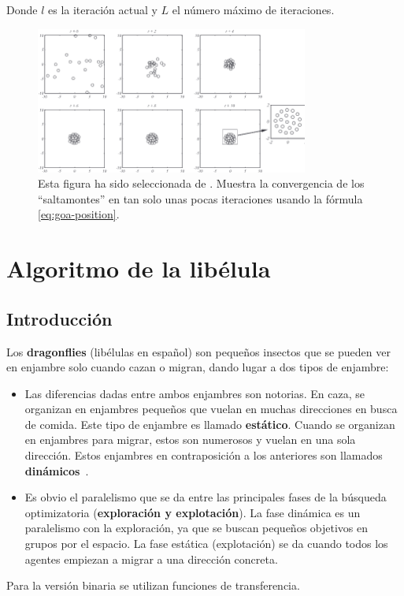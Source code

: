 Donde $l$ es la iteración actual y $L$ el número máximo de iteraciones.

\begin{figure}[htp]
    \begin{center}
        \includegraphics[width=0.8\textwidth]{imagenes/goa-position-convergence.png}
    \end{center}
    \caption[Convergencia en GOA]{Esta figura ha sido seleccionada de \cite{saremi_grasshopper_2017}. Muestra la convergencia de los ``saltamontes'' en tan solo unas pocas iteraciones usando la fórmula \ref{eq:goa-position}.}
\end{figure}

\section{Algoritmo de la libélula}
\subsection{Introducción}
Los \textbf{dragonflies} (libélulas en español) son pequeños insectos que se pueden ver en enjambre solo cuando cazan o migran, dando lugar a dos tipos de enjambre:
\begin{itemize}
    \item Las diferencias dadas entre ambos enjambres son notorias. En caza, se organizan en enjambres pequeños que vuelan en muchas direcciones en busca de comida. Este tipo de enjambre es llamado \textbf{estático}. Cuando se organizan en enjambres para migrar, estos son numerosos y vuelan en una sola dirección. Estos enjambres en contraposición a los anteriores son llamados \textbf{dinámicos}~\cite{mirjalili_dragonfly_2016}.
    \item Es obvio el paralelismo que se da entre las principales fases de la búsqueda optimizatoria (\textbf{exploración y explotación}). La fase dinámica es un paralelismo con la exploración, ya que se buscan pequeños objetivos en grupos por el espacio. La fase estática (explotación) se da cuando todos los agentes empiezan a migrar a una dirección concreta.
\end{itemize}
Para la versión binaria se utilizan funciones de transferencia.

